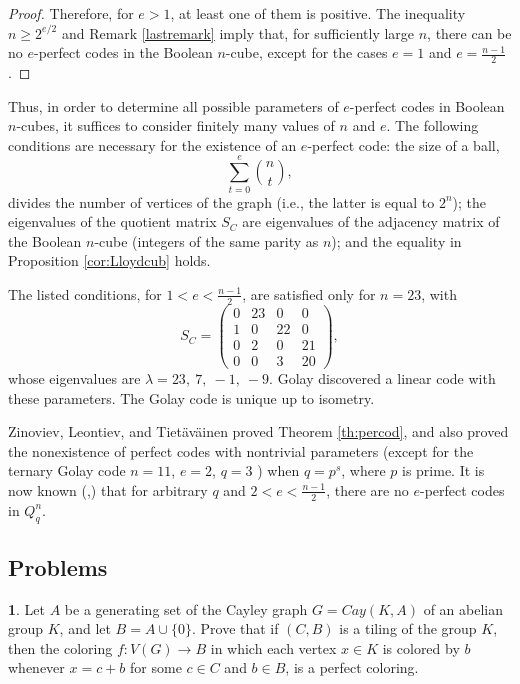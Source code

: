 \documentclass[11pt]{article}
\theoremstyle{definition}
\newtheorem{exercise}{\quad}
\begin{document}
{{{\begin{proof}
Therefore, for $e>1$, at least one of them is positive. The 
inequality   $n\geq 2^{e/2}$ and Remark \ref{lastremark} imply that, for sufficiently
large $n$, there can be no $e$-perfect codes in the Boolean
$n$-cube, except for the cases $e=1$ and
$e=\frac{n-1}{2}$.

\end{proof}

Thus, in order to determine all possible parameters of
$e$-perfect codes in Boolean $n$-cubes, it suffices to consider
finitely many values of $n$ and $e$. The following conditions are
necessary for the existence of an $e$-perfect code: the size of a
ball,
\[
\sum\limits_{t=0}^e{n\choose t},
\]
divides the number of vertices of the graph (i.e., the latter is equal
to $2^n$); the eigenvalues of the quotient matrix $S_C$ are
eigenvalues of the adjacency matrix of the Boolean $n$-cube (integers
of the same parity as $n$); and the equality in Proposition
\ref{cor:Lloydcub} holds.

The listed conditions, for
$1<e<\frac{n-1}{2}$, are satisfied only for $n=23$, with
\[
S_C=
\begin{pmatrix}
0 & 23 & 0 & 0\\
1 & 0 & 22 & 0\\
0 & 2 & 0 & 21\\
0 & 0 & 3 & 20
\end{pmatrix},
\]
whose eigenvalues are
$\lambda=23,\ 7,\ -1,\ -9$.
Golay \cite{Golay} discovered a linear code with these parameters.
The Golay code is unique up to isometry.

Zinoviev, Leontiev, and Tiet\"av\"ainen proved
Theorem \ref{th:percod}, and also proved the nonexistence of perfect codes with
nontrivial parameters (except for the ternary Golay code
$n=11$, $e=2$, $q=3$ \cite{Golay}) when $q=p^s$, where $p$ is prime.
It is now known (\cite{ZL73},\cite{BZLF}) that for arbitrary $q$ and
$2<e<\frac{n-1}{2}$, there are no $e$-perfect codes in $Q^n_q$.


\subsection{Problems}


\begin{exercise}

Let $A$ be a generating set of the Cayley graph
$G=Cay(K,A)$ of an abelian group $K$, and let
$B=A\cup\{0\}$. Prove that if $(C,B)$ is a tiling of the group $K$,
then the coloring $f:V(G)\rightarrow B$ in which each vertex
$x\in K$ is colored by $b$ whenever $x=c+b$ for some
$c\in C$ and $b\in B$, is a perfect coloring.
\end{exercise}

}}}
\end{document}
